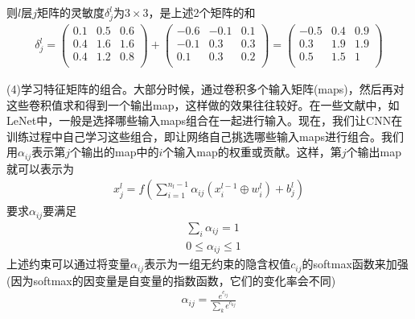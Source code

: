             则$l$层$j$矩阵的灵敏度$\delta_j^l$为$3\times 3$，是上述2个矩阵的和
            \begin{align*}
            \delta_j^l =
            \begin{pmatrix}
            0.1 & 0.5 & 0.6\\
            0.4 & 1.6 & 1.6\\
            0.4 & 1.2 & 0.8\\
            \end{pmatrix}
            +
            \begin{pmatrix}
            -0.6 & -0.1 & 0.1\\
            -0.1 & 0.3 & 0.3\\
            0.1 & 0.3 & 0.2\\
            \end{pmatrix}
            =
             \begin{pmatrix}
            -0.5 & 0.4 & 0.9\\
            0.3 & 1.9 & 1.9\\
            0.5 & 1.5 & 1\\
            \end{pmatrix}
            \end{align*}
            \par
            (4)学习特征矩阵的组合。大部分时候，通过卷积多个输入矩阵(maps)，然后再对这些卷积值求和得到一个输出map，这样做的效果往往较好。在一些文献中，如LeNet中，一般是选择哪些输入maps组合在一起进行输入。现在，我们让CNN在训练过程中自己学习这些组合，即让网络自己挑选哪些输入maps进行组合。我们用$\alpha_{ij}$表示第$j$个输出的map中的$i$个输入map的权重或贡献。这样，第$j$个输出map就可以表示为
            \begin{align*}
            x_j^l =f \left( \sum_{i=1}^{n_l-1} \alpha_{ij}(x_i^{l-1}\oplus w_i^l) + b_j^l \right)
            \end{align*}
            要求$\alpha_{ij}$要满足
            \begin{align*}
            &\sum_i \alpha_{ij} = 1\\
            &0 \leqslant \alpha_{ij} \leqslant 1
            \end{align*}
            上述约束可以通过将变量$\alpha_{ij}$表示为一组无约束的隐含权值$c_{ij}$的softmax函数来加强(因为softmax的因变量是自变量的指数函数，它们的变化率会不同)
            \begin{align*}
            \alpha_{ij} = \frac{e^{c_{ij}}}{\sum_ke^{c_{kj}}}
            \end{align*}
